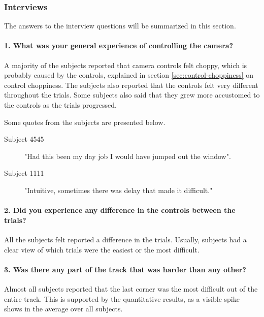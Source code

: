 \documentclass[nofilelist]{cslthse-msc}
\begin{document}
\subsubsection{Interviews}
The answers to the interview questions will be summarized in this section.

\titleformat{\paragraph}[hang]{\normalfont\small\bfseries}{\theparagraph}{1em}{}

\paragraph{1. What was your general experience of controlling the camera?}
A majority of the subjects reported that camera controls felt choppy, which is probably caused by the controls, explained in section \ref{sec:control-choppiness} on control choppiness. The subjects also reported that the controls felt very different throughout the trials. Some subjects also said that they grew more accustomed to the controls as the trials progressed.

Some quotes from the subjects are presented below.
\begin{description}
   \item[Subject 4545] "Had this been my day job I would have jumped out the window". 
   \item[Subject 1111] "Intuitive, sometimes there was delay that made it difficult."
\end{description}

\paragraph{2. Did you experience any difference in the controls between the trials?}
All the subjects felt reported a difference in the trials. Usually, subjects had a clear view of which trials were the easiest or the most difficult.

\paragraph{3. Was there any part of the track that was harder than any other?}
Almost all subjects reported that the last corner was the most difficult out of the entire track. This is supported by the quantitative results, as a visible spike shows in the average over all subjects.
\end{document}
